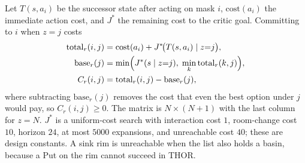 \documentclass[conference]{IEEEtran}
\begin{document}
Let $T(s,a_i)$ be the successor state after acting on mask $i$, $\mathrm{cost}(a_i)$ the immediate action cost, and $J^\ast$ the remaining cost to the critic goal.
Committing to $i$ when $z{=}j$ costs
\begin{align}
\mathrm{total}_r(i,j) &= \mathrm{cost}(a_i)+J^\ast\!\bigl(T(s,a_i)\mid z{=}j\bigr), \label{eq:total}\\
\mathrm{base}_r(j) &= \min\Bigl(J^\ast(s\mid z{=}j),\;\min_k\mathrm{total}_r(k,j)\Bigr), \label{eq:base}\\
C_r(i,j) &= \mathrm{total}_r(i,j)-\mathrm{base}_r(j), \label{eq:C}
\end{align}
where subtracting $\mathrm{base}_r(j)$ removes the cost that even the best option under $j$ would pay, so $C_r(i,j)\ge 0$.
The matrix is $N\times(N{+}1)$ with the last column for $z{=}N$.
$J^\ast$ is a uniform-cost search with interaction cost $1$, room-change cost $10$, horizon $24$, at most $5000$ expansions, and unreachable cost $40$; these are design constants.
A sink rim is unreachable when the list also holds a basin, because a Put on the rim cannot succeed in THOR.
\end{document}
